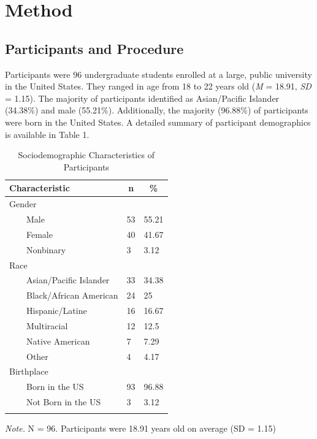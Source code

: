 \documentclass[
  english,
  man,floatsintext]{apa6}
\begin{document}
\section{Method}\label{method}

\subsection{Participants and Procedure}\label{participants-and-procedure}

Participants were 96 undergraduate students enrolled at a large, public university in the United States. They ranged in age from 18 to 22 years old (\emph{M} = 18.91, \emph{SD} = 1.15). The majority of participants identified as Asian/Pacific Islander (34.38\%) and male (55.21\%). Additionally, the majority (96.88\%) of participants were born in the United States. A detailed summary of participant demographics is available in Table 1.

\begin{table}[tbp]

\begin{center}
\begin{threeparttable}

\caption{\label{tab:descriptive table}Sociodemographic Characteristics of Participants}

\begin{tabular}{lll}
\toprule
Characteristic & \multicolumn{1}{c}{n} & \multicolumn{1}{c}{\%}\\
\midrule
Gender &  & \\
\ \ \ \  Male & 53 & 55.21\\
\ \ \ \  Female & 40 & 41.67\\
\ \ \ \  Nonbinary & 3 & 3.12\\
Race &  & \\
\ \ \ \  Asian/Pacific Islander & 33 & 34.38\\
\ \ \ \  Black/African American & 24 & 25\\
\ \ \ \  Hispanic/Latine & 16 & 16.67\\
\ \ \ \  Multiracial & 12 & 12.5\\
\ \ \ \  Native American & 7 & 7.29\\
\ \ \ \  Other & 4 & 4.17\\
Birthplace &  & \\
\ \ \ \  Born in the US & 93 & 96.88\\
\ \ \ \  Not Born in the US & 3 & 3.12\\
\bottomrule
\addlinespace
\end{tabular}

\begin{tablenotes}[para]
\normalsize{\textit{Note.} N = 96. Participants were 18.91 years old on average (SD = 1.15)}
\end{tablenotes}

\end{threeparttable}
\end{center}

\end{table}
\end{document}
